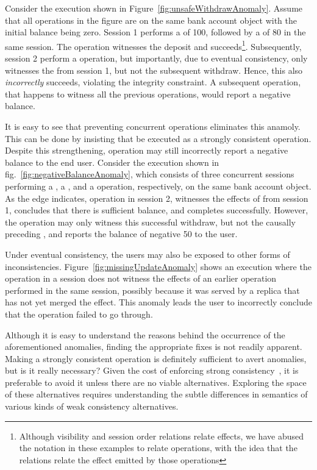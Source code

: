 Consider the execution shown in Figure~\ref{fig:unsafeWithdrawAnomaly}. Assume
that all operations in the figure are on the same bank account object with the
initial balance being zero. Session 1 performs a  of 100, followed
by a  of 80 in the same session. The  operation
witnesses the deposit and succeeds\footnote{Although visibility and session
order relations relate effects, we have abused the notation in these examples
to relate operations, with the idea that the relations relate the effect
emitted by those operations}. Subsequently, session 2 perform a 
operation, but importantly, due to eventual consistency, only witnesses the
 from session 1, but not the subsequent withdraw. Hence, this
 also \emph{incorrectly} succeeds, violating the integrity
constraint. A subsequent  operation, that happens to witness all
the previous operations, would report a negative balance.

It is easy to see that preventing concurrent  operations
eliminates this anamoly. This can be done by insisting that  be
executed as a strongly consistent operation. Despite this strengthening,
 operation may still incorrectly report a negative balance to
the end user. Consider the execution shown in
fig.~\ref{fig:negativeBalanceAnomaly}, which consists of three concurrent
sessions performing a , a , and a 
operation, respectively, on the same bank account object. As the  edge
indicates, operation  in session 2, witnesses the effects of
 from session 1, concludes that there is sufficient balance,
and completes successfully. However, the  operation may only
witness this successful withdraw, but not the causally preceding ,
and reports the balance of negative 50 to the user.

Under eventual consistency, the users may also be exposed to other forms of
inconsistencies. Figure~\ref{fig:missingUpdateAnomaly} shows an execution where
the  operation in a session does not witness the effects of an
earlier  operation performed in the same session, possibly because
it was served by a replica that has not yet merged the  effect.
This anomaly leads the user to incorrectly conclude that the 
operation failed to go through.

Although it is easy to understand the reasons behind the occurrence of the
aforementioned anomalies, finding the appropriate fixes is not readily
apparent. Making  a strongly consistent operation is definitely
sufficient to avert anomalies, but is it really necessary? Given the cost of
enforcing strong consistency~\cite{DynamoDB, Pileus}, it is preferable to avoid
it unless there are no viable alternatives. Exploring the space of these
alternatives requires understanding the subtle differences in semantics of
various kinds of weak consistency alternatives.

